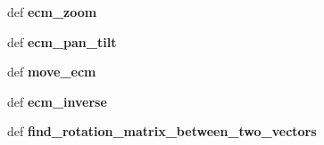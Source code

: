 \begin{DoxyCompactItemize}
\item 
\hypertarget{classcamera__control__node_1_1Joystick_a4e044503ddaf52beed10a40dc8f7393b}{def {\bfseries ecm\-\_\-zoom}}\label{classcamera__control__node_1_1Joystick_a4e044503ddaf52beed10a40dc8f7393b}

\item 
\hypertarget{classcamera__control__node_1_1Joystick_addaad41efd9c5b295a5ac5292b1ccd58}{def {\bfseries ecm\-\_\-pan\-\_\-tilt}}\label{classcamera__control__node_1_1Joystick_addaad41efd9c5b295a5ac5292b1ccd58}

\item 
\hypertarget{classcamera__control__node_1_1Joystick_addd6b22853ec207c38f4d46c8b4dea8e}{def {\bfseries move\-\_\-ecm}}\label{classcamera__control__node_1_1Joystick_addd6b22853ec207c38f4d46c8b4dea8e}

\item 
\hypertarget{classcamera__control__node_1_1Joystick_a61c5bcd6529c6879a7f9e31ac137dfd3}{def {\bfseries ecm\-\_\-inverse}}\label{classcamera__control__node_1_1Joystick_a61c5bcd6529c6879a7f9e31ac137dfd3}

\item 
\hypertarget{classcamera__control__node_1_1Joystick_a3cae95116ab2d0247069207d0b751ede}{def {\bfseries find\-\_\-rotation\-\_\-matrix\-\_\-between\-\_\-two\-\_\-vectors}}\label{classcamera__control__node_1_1Joystick_a3cae95116ab2d0247069207d0b751ede}

\end{DoxyCompactItemize}
